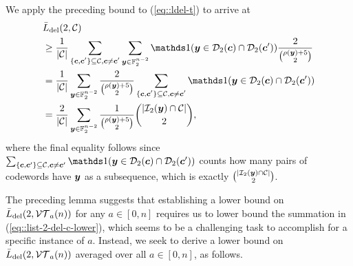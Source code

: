 \documentclass[conference, a4paper]{IEEEtran}
\begin{document}
\begin{IEEEproof}
We apply the preceding bound to (\ref{eq::ldel-t}) to arrive at
\begin{align}
    &\listdel{2}{\cC} \nonumber \\
    &\geq \frac{1}{|\cC|} \sum_{\substack{\{ \bfc,\bfc'\} \subseteq \cC, \bfc \neq \bfc'}}  \sum_{\bfy \in \Ftwo^{n-2}} \indicator(\bfy \in \balldel{\bfc}{2} \cap \balldel{\bfc'}{2}) \frac{2}{\binom{\rho(\bfy) + 5}{2}} \nonumber \\
    &= \frac{1}{|\cC|}\sum_{{\bfy \in \Ftwo^{n-2}}} \frac{2}{\binom{\rho(\bfy) + 5}{2}} \sum_{\substack{\{ \bfc,\bfc' \} \subseteq \cC , \bfc \neq \bfc'}} \indicator(\bfy \in \balldel{\bfc}{2} \cap \balldel{\bfc'}{2}) \nonumber \\
    &= \frac{2}{|\cC|} \sum_{\bfy \in \Ftwo^{n-2}} \frac{1}{\binom{\rho(\bfy) + 5}{2}} \binom{|\ballins{\bfy}{2} \cap \cC|}{2}, \label{eq::list-2-del-c-lower}
\end{align}
where the final equality follows since $\sum_{\{ \bfc,\bfc' \} \subseteq \cC,\bfc \neq \bfc'} \indicator(\bfy \in \balldel{\bfc}{2} \cap \balldel{\bfc'}{2})$ counts how many pairs of codewords have ${\boldsymbol y}$ as a subsequence, which is exactly $\binom{|\mathcal{I}_{2}({\boldsymbol y}) \cap \mathcal{C}|}{2}$.
\end{IEEEproof}

The preceding lemma suggests that establishing a lower bound on $\bar{L}_\mathrm{del}(2,\mathcal{VT}_{a}(n))$ for any $a \in [0,n]$ requires us to lower bound the summation in (\ref{eq::list-2-del-c-lower}), which seems to be a challenging task to accomplish for a specific instance of $a$. Instead, we seek to derive a lower bound on $\bar{L}_\mathrm{del}(2,\mathcal{VT}_{a}(n))$ averaged over all $a \in [0,n]$, as follows.
\end{document}
